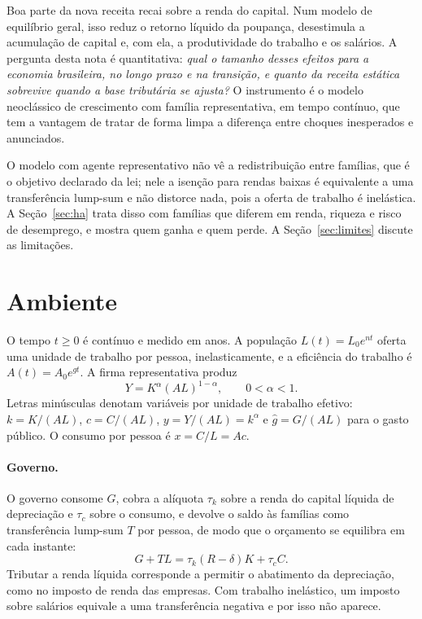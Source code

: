 \documentclass[11pt,a4paper]{article}
\begin{document}
Boa parte da nova receita recai sobre a renda do capital. Num modelo de
equilíbrio geral, isso reduz o retorno líquido da poupança, desestimula a
acumulação de capital e, com ela, a produtividade do trabalho e os salários.
A pergunta desta nota é quantitativa: \emph{qual o tamanho desses efeitos
para a economia brasileira, no longo prazo e na transição, e quanto da receita
estática sobrevive quando a base tributária se ajusta?} O instrumento é o
modelo neoclássico de crescimento com família representativa, em tempo contínuo,
que tem a vantagem de tratar de forma limpa a diferença entre choques
inesperados e anunciados.

O modelo com agente representativo não vê a redistribuição entre famílias,
que é o objetivo declarado da lei; nele a isenção para rendas baixas é
equivalente a uma transferência lump-sum e não distorce nada, pois a oferta de
trabalho é inelástica. A Seção~\ref{sec:ha} trata disso com famílias que
diferem em renda, riqueza e risco de desemprego, e mostra quem ganha e quem
perde. A Seção~\ref{sec:limites} discute as limitações.

\section{Ambiente}

O tempo $t\ge0$ é contínuo e medido em anos. A população $L(t)=L_0e^{nt}$
oferta uma unidade de trabalho por pessoa, inelasticamente, e a eficiência do
trabalho é $A(t)=A_0e^{gt}$. A firma representativa produz
\begin{equation}
 Y=K^\alpha(AL)^{1-\alpha},\qquad 0<\alpha<1.
 \label{eq:producao}
\end{equation}
Letras minúsculas denotam variáveis por unidade de trabalho efetivo:
$k=K/(AL)$, $c=C/(AL)$, $y=Y/(AL)=k^\alpha$ e $\hat g=G/(AL)$ para o gasto
público. O consumo por pessoa é $x=C/L=Ac$.

\paragraph{Governo.} O governo consome $G$, cobra a alíquota $\tau_k$ sobre a
renda do capital líquida de depreciação e $\tau_c$ sobre o consumo, e devolve
o saldo às famílias como transferência lump-sum $T$ por pessoa, de modo que o
orçamento se equilibra em cada instante:
\begin{equation}
 G+TL=\tau_k(R-\delta)K+\tau_cC.
 \label{eq:governo}
\end{equation}
Tributar a renda líquida corresponde a permitir o abatimento da depreciação,
como no imposto de renda das empresas. Com trabalho inelástico, um imposto
sobre salários equivale a uma transferência negativa e por isso não aparece.
\end{document}
